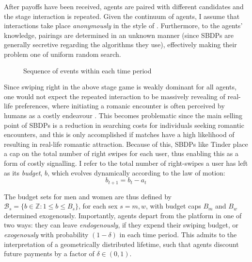 After payoffs have been received, agents are paired with different candidates and the stage interaction is repeated. Given the continuum of agents, I assume that interactions take place \textit{anonymously} in the style of \cite{jovanovic1988anonymous}. Furthermore, to the agents' knowledge, pairings are determined in an unknown manner (since SBDPs are generally secretive regarding the algorithms they use), effectively making their problem one of uniform random search.

\begin{figure}[ht]
    \centering 
    \caption{Sequence of events within each time period}
    \vspace{20pt} 
    \label{fig:timeline}
\end{figure}

Since swiping right in the above stage game is weakly dominant for all agents, one would not expect the repeated interaction to be massively revealing of real-life preferences, where initiating a romanic encounter is often perceived by humans as a costly endeavour \citep{dawkins2017selfish}. This becomes problematic since the main selling point of SBDPs is a reduction in searching costs for individuals seeking romantic encounters, and this is only accomplished if matches have a high likelihood of resulting in real-life romantic attraction. Because of this, SBDPs like Tinder place a cap on the total number of right swipes for each user, thus enabling this as a form of costly signalling. I refer to the total number of right-swipes a user has left as its \textit{budget}, $b$, which evolves dynamically according to the law of motion: 
\begin{equation*} 
  b_{t+1}= b_{t} - a_t
\end{equation*}

The budget sets for men and women are thus defined by $\mathcal{B}_{s}=\{b \in \mathbb{Z} : 1\leq b \leq B_s\}$, for each sex $s=m,w$, with budget caps $B_m$ and $B_w$ determined exogenously. Importantly, agents depart from the platform in one of two ways: they can leave \textit{endogenously}, if they expend their swiping budget, or \textit{exogenously} with probability $(1-\delta)$ in each time period. This admits to the interpretation of a geometrically distributed lifetime, such that agents discount future payments by a factor of $\delta\in(0,1)$. 

